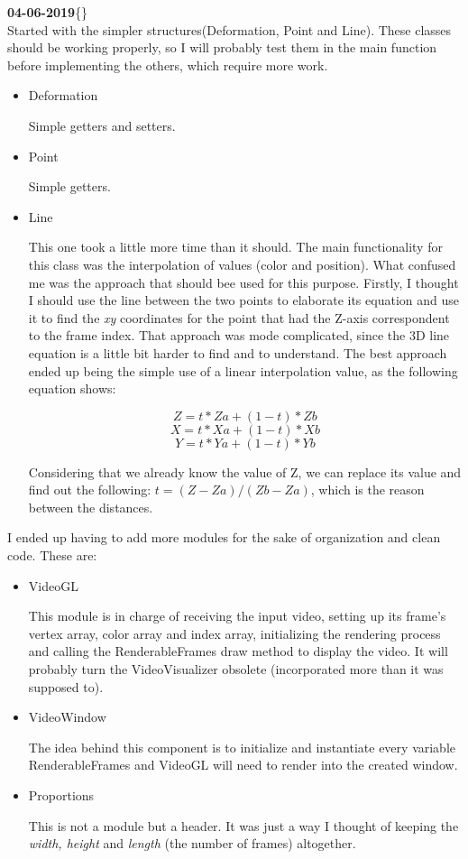 \documentclass[12pt, a4paper]{report}
\newenvironment{loggentry}[2]%
{\noindent\textbf{#2}\newline\{\marginnote{#1}\}\newline\\}{\vspace{1.0cm}}
\begin{document}
	\begin{loggentry}{Implementing The Project}{04-06-2019}	
		Started with the simpler structures(Deformation, Point and Line). These classes should be working properly, so I will probably test them in the main function before implementing the others, which require more work.
		\begin{itemize}
				\item Deformation

					Simple getters and setters.
				
				\item Point

					Simple getters.			
				
				\item Line

					This one took a little more time than it should. The main functionality for this class was the interpolation of values (color and position). What confused me was the approach that should bee used for this purpose. Firstly, I thought I should use the line between the two points to elaborate its equation and use it to find the \textit{xy} coordinates for the point that had the Z-axis correspondent to the frame index. That approach was mode complicated, since the 3D line equation is a little bit harder to find and to understand. The best approach ended up being the simple use of a linear interpolation value, as the following equation shows:

					$$Z = t * Za + (1 - t) * Zb$$
					$$X = t * Xa + (1 - t) * Xb$$
					$$Y = t * Ya + (1 - t) * Yb$$
					
					Considering that we already know the value of Z, we can replace its value and find out the following: $t =  (Z - Za)/(Zb - Za)$, which is the reason between the distances.
		\end{itemize}
	
		I ended up having to add more modules for the sake of organization and clean code. These are:

		\begin{itemize}
				\item VideoGL

					This module is in charge of receiving the input video, setting up its frame's vertex array, color array and index array, initializing the rendering process and calling the RenderableFrames draw method to display the video. It will probably turn the VideoVisualizer obsolete (incorporated more than it was supposed to).

				\item VideoWindow

					The idea behind this component is to initialize and instantiate every variable RenderableFrames and VideoGL will need to render into the created window.

				\item Proportions

					This is not a module but a header. It was just a way I thought of keeping the \textit{width, height} and \textit{length} (the number of frames) altogether.
		\end{itemize}

	\end{loggentry}
\end{document}
